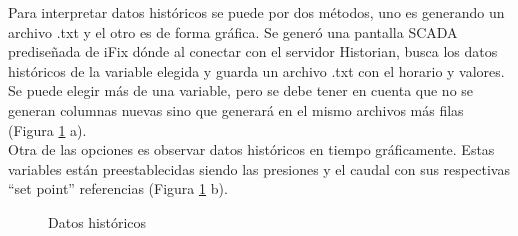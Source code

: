 Para interpretar datos históricos se puede por dos métodos, uno es generando un archivo .txt y el otro es de forma gráfica. 
Se generó una pantalla SCADA prediseñada de iFix dónde al conectar con el servidor Historian, busca los datos históricos de la variable elegida y guarda un archivo .txt con el horario y valores. Se puede elegir más de una variable, pero se debe tener en cuenta que no se generan columnas nuevas sino que generará en el mismo archivos más filas (Figura \ref{fig:grafhist} a).\\
Otra de las opciones es observar datos históricos en tiempo gráficamente. Estas variables están preestablecidas siendo las presiones y el caudal con sus respectivas ``set point'' referencias (Figura \ref{fig:grafhist} b).


\begin{figure}[htbp]
	\centering
	\caption{Datos históricos} \label{fig:grafhist}
\end{figure}





\newpage